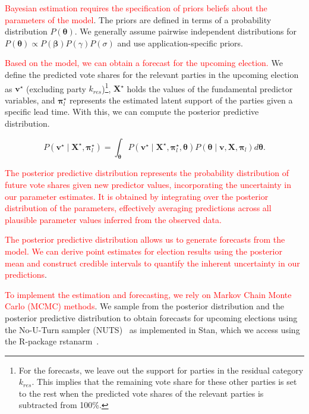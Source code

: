 \documentclass[12pt]{article}
\begin{document}
\begin{doublespacing}
\textcolor{red}{Bayesian estimation requires the specification of priors  beliefs about the parameters of the model}. The priors are defined in terms of a probability distribution $P\left(\bm{\theta}\right)$. We generally assume pairwise independent distributions for $P\left(\bm{\theta}\right) \propto P\left(\bm{\beta}\right)P\left( \gamma\right)P\left(\sigma \right)$ and use application-specific priors.

\textcolor{red}{Based on the model, we can obtain a forecast for the upcoming election.} We define the predicted vote shares for the relevant parties in the upcoming election as $\bm{v}^{\star}$ (excluding party $k_{res}$)\footnote{For the forecasts, we leave out the support for parties in the residual category $k_{res}$. This implies that the remaining vote share for these other parties is set to the rest when the predicted vote shares of the relevant parties is subtracted from 100\%.}, $\bm{X}^{\star}$ holds the values of the fundamental predictor variables, and $\bm{\pi}_{l}^{\star}$ represents the estimated  latent support of the parties given a specific lead time. With this, we can compute the posterior predictive distribution. 


\begin{equation}
P\left(\bm{v}^{\star} \mid \bm{X}^{\star}, \bm{\pi}_{l}^{\star} \right) = \int_{\bm{\theta}} P\left(\bm{v}^{\star} \mid \bm{X}^{\star},  \bm{\pi}_{l}^{\star},  \bm{\theta} \right)  P\left(\bm{\theta} \mid \bm{v}, \bm{X},  \bm{\pi}_{l}  \right) d\bm{\theta}.
\end{equation}

\textcolor{red}{The posterior predictive distribution represents the probability distribution of future vote shares given new predictor values, incorporating the uncertainty in our parameter estimates. It is obtained by integrating over the posterior distribution of the parameters, effectively averaging predictions across all plausible parameter values inferred from the observed data.}

\textcolor{red}{The posterior predictive distribution allows us to generate forecasts from the model. We can derive point estimates for election results using the posterior mean and construct credible intervals to quantify the inherent uncertainty in our predictions}. 
 

\textcolor{red}{To implement the estimation and forecasting, we rely on Markov Chain Monte Carlo (MCMC) methods}. We sample from the posterior distribution and the posterior predictive distribution to obtain forecasts for upcoming elections using the No-U-Turn sampler (NUTS)~\citep{carpenter2017stan} as implemented in Stan, which we access using the R-package rstanarm~\citep{rstanarm}.  


\end{doublespacing}
\end{document}
